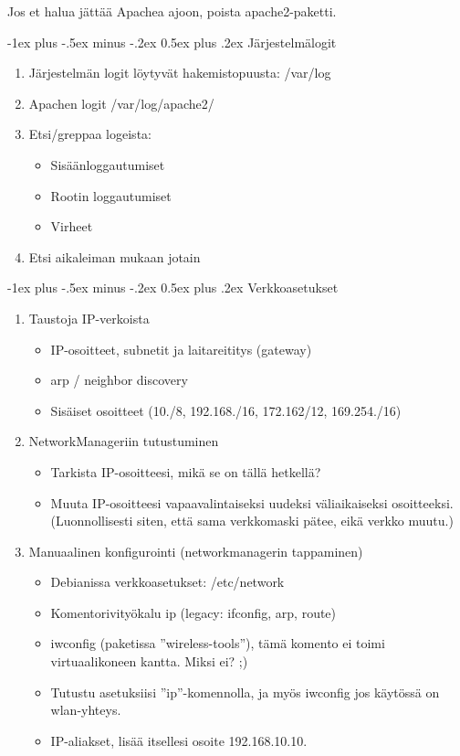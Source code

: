 \documentclass[12pt,portrait,a4]{article}
\makeatletter
\renewcommand{\section}{\@startsection{section}{1}{0mm}%
                                {-1ex plus -.5ex minus -.2ex}%
                                {0.5ex plus .2ex}%
                                {\normalfont\large\bfseries}}
\makeatother
\begin{document}
Jos et halua jättää Apachea ajoon, poista apache2-paketti.

\section{Järjestelmälogit}

\begin{enumerate}
\item Järjestelmän logit löytyvät hakemistopuusta: /var/log
\item Apachen logit /var/log/apache2/
\item Etsi/greppaa logeista:
	\begin{itemize}
	\item Sisäänloggautumiset
	\item Rootin loggautumiset
	\item Virheet
	\end{itemize}
\item Etsi aikaleiman mukaan jotain
\end{enumerate}

\section{Verkkoasetukset}

\begin{enumerate}
\item Taustoja IP-verkoista
	\begin{itemize}
	\item IP-osoitteet, subnetit ja laitareititys (gateway)
	\item arp / neighbor discovery
	\item Sisäiset osoitteet (10./8, 192.168./16, 172.162/12, 169.254./16)
	\end{itemize}
\item NetworkManageriin tutustuminen
	\begin{itemize}
	\item Tarkista IP-osoitteesi, mikä se on tällä hetkellä?
	\item Muuta IP-osoitteesi vapaavalintaiseksi uudeksi väliaikaiseksi osoitteeksi. (Luonnollisesti siten, että sama verkkomaski pätee, eikä verkko muutu.)
	\end{itemize}
\item Manuaalinen konfigurointi (networkmanagerin tappaminen)
	\begin{itemize}
	\item Debianissa verkkoasetukset: /etc/network
	\item Komentorivityökalu ip (legacy: ifconfig, arp, route)
	\item iwconfig (paketissa ''wireless-tools''), tämä komento ei toimi virtuaalikoneen kantta. Miksi ei? ;)
	\item Tutustu asetuksiisi ''ip''-komennolla, ja myös iwconfig jos
	käytössä on wlan-yhteys.
	\item IP-aliakset, lisää itsellesi osoite 192.168.10.10.
	\end{itemize}
\end{enumerate}
\end{document}

